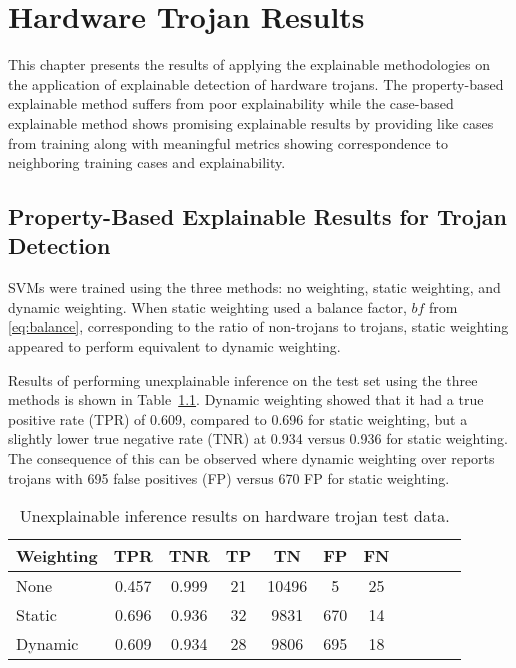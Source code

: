 \chapter{Hardware Trojan Results} \label{ch:trojan_results}

This chapter presents the results of applying the explainable methodologies on
the application of explainable detection of hardware trojans.  The
property-based explainable method suffers from poor explainability while the
case-based explainable method shows promising explainable results by providing
like cases from training along with meaningful metrics showing correspondence to
neighboring training cases and explainability.


\section{Property-Based Explainable Results for Trojan Detection} \label{prop_exp_results_trojan}

SVMs were trained using the three methods: no weighting, static weighting, and
dynamic weighting.  When static weighting used a balance factor, $bf$ from
\ref{eq:balance}, corresponding to the ratio of non-trojans to trojans, static
weighting appeared to perform equivalent to dynamic weighting.

Results of performing unexplainable inference on the test set using the three
methods is shown in Table~\ref{tab_unexp_weight_comp}. Dynamic weighting showed
that it had a true positive rate (TPR) of 0.609, compared to 0.696 for static
weighting, but a slightly lower true negative rate (TNR) at 0.934 versus 0.936
for static weighting. The consequence of this can be observed where dynamic
weighting over reports trojans with 695 false positives (FP) versus 670 FP for
static weighting.

\begin{table}[H]
    \renewcommand{\arraystretch}{1.3}
    \centering
    \caption{Unexplainable inference results on hardware trojan test data.}
    \begin{tabular}{|l|c|c|c|c|c|c|c|c|c|c|}
        \hline
         Weighting &  TPR &  TNR &  TP &  TN &  FP &  FN \\
        \hline
        \hline
        None & 0.457 & 0.999 & 21 & 10496 & 5 & 25 \\
        \hline
        Static & 0.696 & 0.936 & 32 & 9831 & 670 & 14 \\
        \hline
        Dynamic & 0.609 & 0.934 & 28 & 9806 & 695 & 18 \\
        \hline
    \end{tabular}
    \label{tab_unexp_weight_comp}
\end{table}

